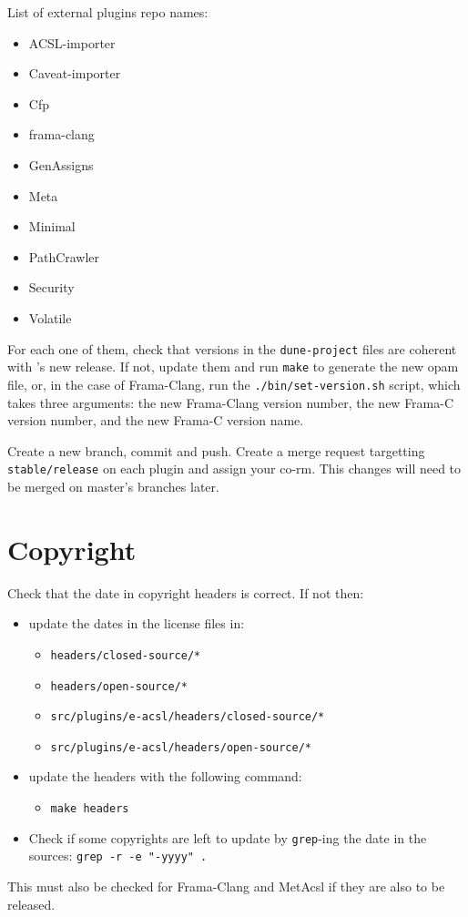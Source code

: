 List of external plugins repo names:
\begin{itemize}
  \item ACSL-importer
  \item Caveat-importer
  \item Cfp
  \item frama-clang
  \item GenAssigns
  \item Meta
  \item Minimal
  \item PathCrawler
  \item Security
  \item Volatile
\end{itemize}
For each one of them, check that versions in the \texttt{dune-project} files are
coherent with \FramaC's new release. If not, update them and run \verb+make+ to
generate the new opam file, or, in the case of Frama-Clang, run the
\texttt{./bin/set-version.sh} script, which takes three arguments: the
new Frama-Clang version number, the new Frama-C version number, and the new
Frama-C version name.

Create a new branch, commit and push. Create a merge
request targetting \texttt{stable/release} on each plugin and assign your co-rm.
This changes will need to be merged on master's branches later.

\section{Copyright}
\label{sec:copyright}

Check that the date in copyright headers is correct. If not then:
\begin{itemize}
  \item update the dates in the license files in:
  \begin{itemize}
    \item \texttt{headers/closed-source/*}
    \item \texttt{headers/open-source/*}
    \item \texttt{src/plugins/e-acsl/headers/closed-source/*}
    \item \texttt{src/plugins/e-acsl/headers/open-source/*}
  \end{itemize}
  \item update the headers with the following command:
  \begin{itemize}
    \item \texttt{make headers}
  \end{itemize}
  \item Check if some copyrights are left to update by \texttt{grep}-ing the date in the sources: \texttt{grep -r -e "-yyyy" .}
\end{itemize}

This must also be checked for Frama-Clang and MetAcsl if they are also to be
released.
